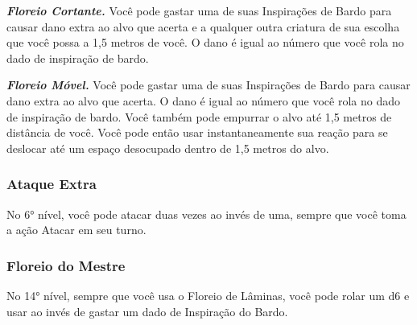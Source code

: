 \begin{multicols}{2}
\textit{\textbf{Floreio Cortante.}} Você pode gastar uma de suas Inspirações de
Bardo para causar dano extra ao alvo que acerta e a qualquer outra criatura de
sua escolha que você possa a 1,5 metros de você. O dano é igual ao número que
você rola no dado de inspiração de bardo.

\textit{\textbf{Floreio Móvel.}} Você pode gastar uma de suas Inspirações de
Bardo para causar dano extra ao alvo que acerta. O dano é igual ao número que
você rola no dado de inspiração de bardo. Você também pode empurrar o alvo até
1,5 metros de distância de você. Você pode então usar instantaneamente sua
reação para se deslocar até um espaço desocupado dentro de 1,5 metros do alvo.

\subsubsection{Ataque Extra}%

No 6° nível, você pode atacar duas vezes ao invés de uma, sempre que você toma a
ação Atacar em seu turno.

\subsubsection{Floreio do Mestre}%

No 14° nível, sempre que você usa o Floreio de Lâminas, você pode rolar um d6 e
usar ao invés de gastar um dado de Inspiração do Bardo.
\end{multicols}


